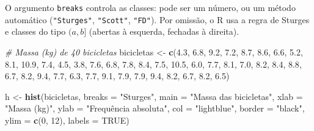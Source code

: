\documentclass[
  portuguese,
  11pt,
  openany]{book}
\newenvironment{Shaded}{\begin{snugshade}}{\end{snugshade}}
\newcommand{\AttributeTok}[1]{\textcolor[rgb]{0.13,0.29,0.53}{#1}}
\newcommand{\CommentTok}[1]{\textcolor[rgb]{0.56,0.35,0.01}{\textit{#1}}}
\newcommand{\ConstantTok}[1]{\textcolor[rgb]{0.56,0.35,0.01}{#1}}
\newcommand{\DecValTok}[1]{\textcolor[rgb]{0.00,0.00,0.81}{#1}}
\newcommand{\FloatTok}[1]{\textcolor[rgb]{0.00,0.00,0.81}{#1}}
\newcommand{\FunctionTok}[1]{\textcolor[rgb]{0.13,0.29,0.53}{\textbf{#1}}}
\newcommand{\NormalTok}[1]{#1}
\newcommand{\OtherTok}[1]{\textcolor[rgb]{0.56,0.35,0.01}{#1}}
\newcommand{\StringTok}[1]{\textcolor[rgb]{0.31,0.60,0.02}{#1}}
\begin{document}
O argumento \texttt{breaks} controla as classes: pode ser um número, ou um método automático
(\texttt{"Sturges"}, \texttt{"Scott"}, \texttt{"FD"}). Por omissão, o R usa a regra de Sturges e classes do
tipo \((a, b]\) (abertas à esquerda, fechadas à direita).

\begin{Shaded}
\begin{Highlighting}[]
\CommentTok{\# Massa (kg) de 40 bicicletas}
\NormalTok{bicicletas }\OtherTok{\textless{}{-}} \FunctionTok{c}\NormalTok{(}\FloatTok{4.3}\NormalTok{, }\FloatTok{6.8}\NormalTok{, }\FloatTok{9.2}\NormalTok{, }\FloatTok{7.2}\NormalTok{, }\FloatTok{8.7}\NormalTok{, }\FloatTok{8.6}\NormalTok{, }\FloatTok{6.6}\NormalTok{, }\FloatTok{5.2}\NormalTok{, }\FloatTok{8.1}\NormalTok{, }\FloatTok{10.9}\NormalTok{,}
                \FloatTok{7.4}\NormalTok{, }\FloatTok{4.5}\NormalTok{, }\FloatTok{3.8}\NormalTok{, }\FloatTok{7.6}\NormalTok{, }\FloatTok{6.8}\NormalTok{, }\FloatTok{7.8}\NormalTok{, }\FloatTok{8.4}\NormalTok{, }\FloatTok{7.5}\NormalTok{, }\FloatTok{10.5}\NormalTok{, }\FloatTok{6.0}\NormalTok{,}
                \FloatTok{7.7}\NormalTok{, }\FloatTok{8.1}\NormalTok{, }\FloatTok{7.0}\NormalTok{, }\FloatTok{8.2}\NormalTok{, }\FloatTok{8.4}\NormalTok{, }\FloatTok{8.8}\NormalTok{, }\FloatTok{6.7}\NormalTok{, }\FloatTok{8.2}\NormalTok{, }\FloatTok{9.4}\NormalTok{, }\FloatTok{7.7}\NormalTok{,}
                \FloatTok{6.3}\NormalTok{, }\FloatTok{7.7}\NormalTok{, }\FloatTok{9.1}\NormalTok{, }\FloatTok{7.9}\NormalTok{, }\FloatTok{7.9}\NormalTok{, }\FloatTok{9.4}\NormalTok{, }\FloatTok{8.2}\NormalTok{, }\FloatTok{6.7}\NormalTok{, }\FloatTok{8.2}\NormalTok{, }\FloatTok{6.5}\NormalTok{)}

\NormalTok{h }\OtherTok{\textless{}{-}} \FunctionTok{hist}\NormalTok{(bicicletas,}
          \AttributeTok{breaks =} \StringTok{"Sturges"}\NormalTok{,}
          \AttributeTok{main =} \StringTok{"Massa das bicicletas"}\NormalTok{,}
          \AttributeTok{xlab =} \StringTok{"Massa (kg)"}\NormalTok{,}
          \AttributeTok{ylab =} \StringTok{"Frequência absoluta"}\NormalTok{,}
          \AttributeTok{col =} \StringTok{"lightblue"}\NormalTok{,}
          \AttributeTok{border =} \StringTok{"black"}\NormalTok{,}
          \AttributeTok{ylim =} \FunctionTok{c}\NormalTok{(}\DecValTok{0}\NormalTok{, }\DecValTok{12}\NormalTok{),}
          \AttributeTok{labels =} \ConstantTok{TRUE}\NormalTok{)}
\end{Highlighting}
\end{Shaded}
\end{document}
